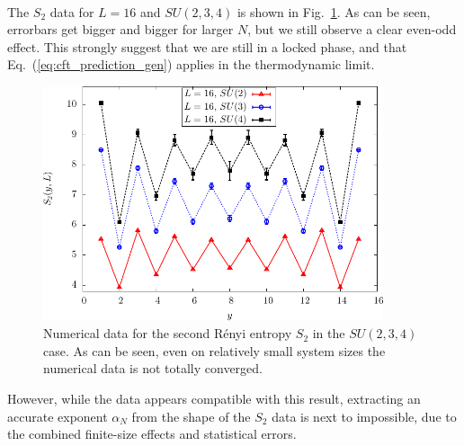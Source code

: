\documentclass[11pt]{iopart}
\begin{document}
\paragraph{}The $S_2$ data for $L=16$ and $SU(2,3,4)$ is shown in Fig.~\ref{fig:SUN_shape}. As can be seen, errorbars get bigger and bigger for larger $N$, but we still observe a clear even-odd effect. This strongly suggest that we are still in a locked phase, and that Eq.~(\ref{eq:cft_prediction_gen}) applies in the thermodynamic limit. 
\begin{figure}[ht]
 \begin{center}
  \includegraphics[width=10cm]{./figures/SUN_shape.pdf}
 \end{center}
\caption{Numerical data for the second R\'enyi entropy $S_2$ in the $SU(2,3,4)$ case. As can be seen, even on relatively small system sizes the numerical data is not totally converged. }
\label{fig:SUN_shape}
\end{figure}
However, while the data appears compatible with this result, extracting an accurate exponent $\alpha_N$ from the shape of the $S_2$ data is next to impossible, due to the combined finite-size effects and statistical errors. 
\end{document}
